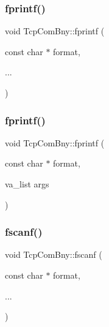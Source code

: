 \mbox{\label{classTcpComBny_a7ee3d2a069a30b89626793f881df6f53}} 
\subsubsection{\texorpdfstring{fprintf()}{fprintf()}\hspace{0.1cm}{\footnotesize\ttfamily [1/2]}}
{\footnotesize\ttfamily void Tcp\+Com\+Bny\+::fprintf (\begin{DoxyParamCaption}\item[{const char $\ast$}]{format,  }\item[{}]{... }\end{DoxyParamCaption})}

\mbox{\label{classTcpComBny_a9fd438f60e9c6f606ed7730c2a17a0fa}} 
\subsubsection{\texorpdfstring{fprintf()}{fprintf()}\hspace{0.1cm}{\footnotesize\ttfamily [2/2]}}
{\footnotesize\ttfamily void Tcp\+Com\+Bny\+::fprintf (\begin{DoxyParamCaption}\item[{const char $\ast$}]{format,  }\item[{va\+\_\+list}]{args }\end{DoxyParamCaption})}

\mbox{\label{classTcpComBny_a44a7024cd03e4fba6090026d3a1665e6}} 
\subsubsection{\texorpdfstring{fscanf()}{fscanf()}\hspace{0.1cm}{\footnotesize\ttfamily [1/2]}}
{\footnotesize\ttfamily void Tcp\+Com\+Bny\+::fscanf (\begin{DoxyParamCaption}\item[{const char $\ast$}]{format,  }\item[{}]{... }\end{DoxyParamCaption})}

